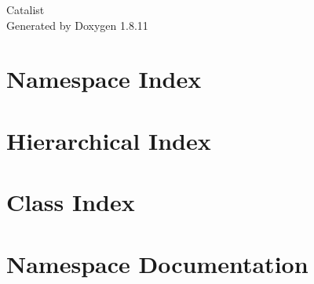 \documentclass[twoside]{book}
\newcommand{\+}{\discretionary{\mbox{\scriptsize$\hookleftarrow$}}{}{}}
\newcommand{\clearemptydoublepage}{%
  \newpage{\pagestyle{empty}\cleardoublepage}%
}
\begin{document}
\hypersetup{pageanchor=false,
             bookmarksnumbered=true,
             pdfencoding=unicode
            }
\begin{titlepage}
\vspace*{7cm}
\begin{center}%
{\Large Catalist }\\
\vspace*{1cm}
{\large Generated by Doxygen 1.8.11}\\
\end{center}
\end{titlepage}
\clearemptydoublepage
\tableofcontents
\clearemptydoublepage
{}
\hypersetup{pageanchor=true}

\chapter{Namespace Index}

\chapter{Hierarchical Index}

\chapter{Class Index}

\chapter{Namespace Documentation}




























\end{document}
